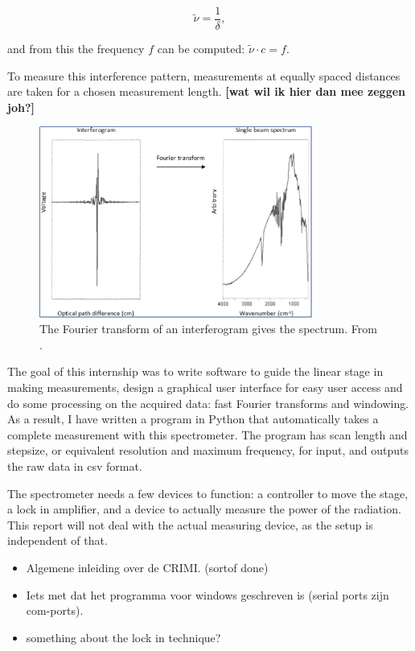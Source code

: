 \[
 \tilde{\nu} = \frac{1}{\delta},
\]

and from this the frequency $f$ can be computed: $\tilde{\nu}\cdot c=f$.

To measure this interference pattern, measurements at equally spaced distances are taken for a chosen measurement length. \textbf{[wat wil ik hier dan mee zeggen joh?]}

\begin{figure}
 \begin{center}
  \includegraphics[width=0.8\textwidth]{figures/randomfouriertransform.png}
  \caption{The Fourier transform of an interferogram gives the spectrum. From \cite{ucdavis}.}
  \label{fig:fouriertransform}
 \end{center}
\end{figure}

The goal of this internship was to write software to guide the linear stage in making measurements, design a graphical user interface for easy user access and do some processing on the acquired data: fast Fourier transforms and windowing. As a result, I have written a program in Python that automatically takes a complete measurement with this spectrometer. The program has scan length and stepsize, or equivalent resolution and maximum frequency, for input, and outputs the raw data in csv format.

The spectrometer needs a few devices to function: a controller to move the stage, a lock in amplifier, and a device to actually measure the power of the radiation. This report will not deal with the actual measuring device, as the setup is independent of that. %

\begin{itemize}
\item Algemene inleiding over de CRIMI. (sortof done)
\item Iets met dat het programma voor windows geschreven is (serial ports zijn com-ports).
\item something about the lock in technique?
\end{itemize}

